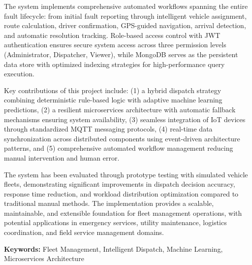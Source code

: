 The system implements comprehensive automated workflows spanning the entire fault lifecycle: from initial fault reporting through intelligent vehicle assignment, route calculation, driver confirmation, GPS-guided navigation, arrival detection, and automatic resolution tracking. Role-based access control with JWT authentication ensures secure system access across three permission levels (Administrator, Dispatcher, Viewer), while MongoDB serves as the persistent data store with optimized indexing strategies for high-performance query execution.

Key contributions of this project include: (1) a hybrid dispatch strategy combining deterministic rule-based logic with adaptive machine learning predictions, (2) a resilient microservices architecture with automatic fallback mechanisms ensuring system availability, (3) seamless integration of IoT devices through standardized MQTT messaging protocols, (4) real-time data synchronization across distributed components using event-driven architecture patterns, and (5) comprehensive automated workflow management reducing manual intervention and human error.

The system has been evaluated through prototype testing with simulated vehicle fleets, demonstrating significant improvements in dispatch decision accuracy, response time reduction, and workload distribution optimization compared to traditional manual methods. The implementation provides a scalable, maintainable, and extensible foundation for fleet management operations, with potential applications in emergency services, utility maintenance, logistics coordination, and field service management domains.

\textbf{Keywords:} Fleet Management, Intelligent Dispatch, Machine Learning, Microservices Architecture
